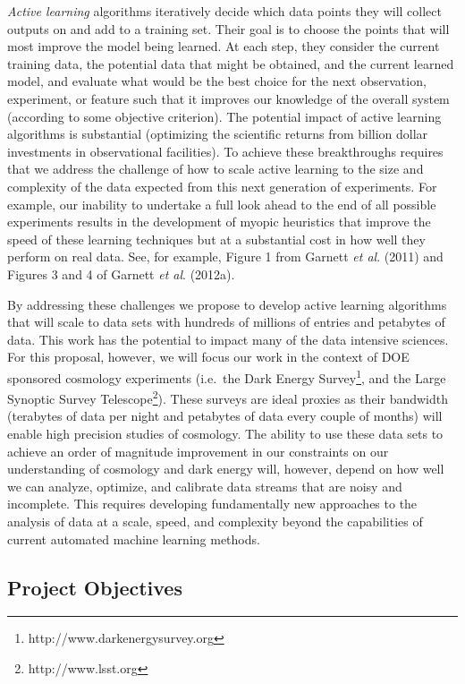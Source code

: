 \documentclass[useAMS,usenatbib,tightenlines,11pt,preprint]{aastex}
\begin{document}
{\it Active learning} algorithms iteratively decide which data
points they will collect outputs on and add to a training set.  Their
goal is to choose the points that will most improve the model being
learned.  At each step, they consider the current training data, the
potential data that might be obtained, and the current learned model,
and evaluate what would be the best choice for the next observation,
experiment, or feature such that it improves our knowledge of the
overall system (according to some objective criterion). The potential
impact of active learning algorithms is substantial (optimizing the
scientific returns from billion dollar investments in observational
facilities). To achieve these breakthroughs requires that we address
the challenge of how to scale active learning to the size and
complexity of the data expected from this next generation of
experiments.  For example, our inability to undertake a full look
ahead to the end of all possible experiments results in the
development of myopic heuristics that improve the speed of these
learning techniques but at a substantial cost in how well they perform
on real data.  See, for example, 
Figure 1 from Garnett {\it et al}. (2011) and Figures
3 and 4 of Garnett {\it et al}. (2012a).

By addressing these challenges we propose to develop active learning
algorithms that will scale to data sets with hundreds of millions of
entries and petabytes of data. This work has the potential to impact
many of the data intensive sciences. For this proposal, however, we
will focus our work in the context of DOE sponsored cosmology
experiments (i.e.\ the Dark Energy
Survey\footnote{http://www.darkenergysurvey.org}, and the Large
Synoptic Survey Telescope\footnote{http://www.lsst.org}). These
surveys are ideal proxies as their bandwidth (terabytes of data per
night and petabytes of data every couple of months) will enable high
precision studies of cosmology. The ability to use these data sets to
achieve an order of magnitude improvement in our constraints on our
understanding of cosmology and dark energy will, however, depend on
how well we can analyze, optimize, and calibrate data streams that are
noisy and incomplete. This requires developing
fundamentally new approaches to the analysis of data at a scale,
speed, and complexity beyond the capabilities of current automated
machine learning methods.

\subsection{Project Objectives}
\label{sec:objectives}
\end{document}
